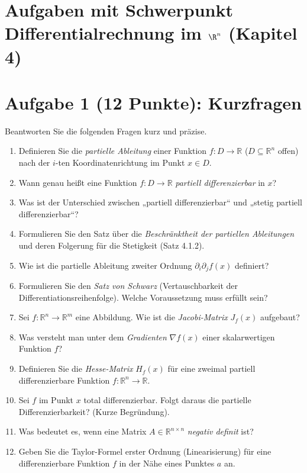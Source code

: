 \newpage
\section{Aufgaben mit Schwerpunkt Differentialrechnung im $\R^n$ (Kapitel 4)}

\section*{Aufgabe 1 (12 Punkte): Kurzfragen}
Beantworten Sie die folgenden Fragen kurz und präzise.

\begin{enumerate}
    \item Definieren Sie die \textit{partielle Ableitung} einer Funktion $f: D \to \mathbb{R}$ ($D \subseteq \mathbb{R}^n$ offen) nach der $i$-ten Koordinatenrichtung im Punkt $x \in D$.
    \item Wann genau heißt eine Funktion $f: D \to \mathbb{R}$ \textit{partiell differenzierbar} in $x$?
    \item Was ist der Unterschied zwischen „partiell differenzierbar“ und „stetig partiell differenzierbar“?
    \item Formulieren Sie den Satz über die \textit{Beschränktheit der partiellen Ableitungen} und deren Folgerung für die Stetigkeit (Satz 4.1.2).
    \item Wie ist die partielle Ableitung zweiter Ordnung $\partial_i \partial_j f(x)$ definiert?
    \item Formulieren Sie den \textit{Satz von Schwarz} (Vertauschbarkeit der Differentiationsreihenfolge). Welche Voraussetzung muss erfüllt sein?
    \item Sei $f: \mathbb{R}^n \to \mathbb{R}^m$ eine Abbildung. Wie ist die \textit{Jacobi-Matrix} $J_f(x)$ aufgebaut?
    \item Was versteht man unter dem \textit{Gradienten} $\nabla f(x)$ einer skalarwertigen Funktion $f$?
    \item Definieren Sie die \textit{Hesse-Matrix} $H_f(x)$ für eine zweimal partiell differenzierbare Funktion $f: \mathbb{R}^n \to \mathbb{R}$.
    \item Sei $f$ im Punkt $x$ total differenzierbar. Folgt daraus die partielle Differenzierbarkeit? (Kurze Begründung).
    \item Was bedeutet es, wenn eine Matrix $A \in \mathbb{R}^{n \times n}$ \textit{negativ definit} ist?
    \item Geben Sie die Taylor-Formel erster Ordnung (Linearisierung) für eine differenzierbare Funktion $f$ in der Nähe eines Punktes $a$ an.
\end{enumerate}

